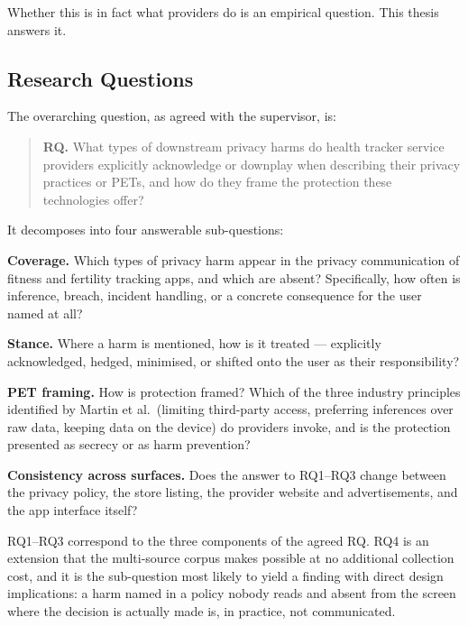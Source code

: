 Whether this is in fact what providers do is an empirical question. This thesis
answers it.

\subsection{Research Questions}

The overarching question, as agreed with the supervisor, is:

\begin{quote}
\textbf{RQ.} What types of downstream privacy harms do health tracker service
providers explicitly acknowledge or downplay when describing their privacy
practices or PETs, and how do they frame the protection these technologies
offer?
\end{quote}

\noindent It decomposes into four answerable sub-questions:

\begin{description}[leftmargin=1.9cm, style=nextline, itemsep=4pt]
  \item[\textbf{RQ1}] \textbf{Coverage.} Which types of privacy harm appear in
    the privacy communication of fitness and fertility tracking apps, and which
    are absent? Specifically, how often is inference, breach, incident handling,
    or a concrete consequence for the user named at all?
  \item[\textbf{RQ2}] \textbf{Stance.} Where a harm is mentioned, how is it
    treated --- explicitly acknowledged, hedged, minimised, or shifted onto the
    user as their responsibility?
  \item[\textbf{RQ3}] \textbf{PET framing.} How is protection framed? Which of
    the three industry principles identified by Martin et al.\ (limiting
    third-party access, preferring inferences over raw data, keeping data on the
    device) do providers invoke, and is the protection presented as secrecy or
    as harm prevention?
  \item[\textbf{RQ4}] \textbf{Consistency across surfaces.} Does the answer to
    RQ1--RQ3 change between the privacy policy, the store listing, the provider
    website and advertisements, and the app interface itself?
\end{description}

RQ1--RQ3 correspond to the three components of the agreed RQ. RQ4 is an
extension that the multi-source corpus makes possible at no additional
collection cost, and it is the sub-question most likely to yield a finding with
direct design implications: a harm named in a policy nobody reads and absent
from the screen where the decision is actually made is, in practice, not
communicated.

